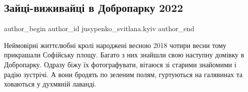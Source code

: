  
 
 
 
 
 
\subsection{Зайці-виживайці в Добропарку 2022}
\label{sec:22_07_2022.fb.jusypenko_svitlana.kyiv.1.zajci_vyzhyvajci_dobropark_2022}
 
\ifcmt
 author_begin
   author_id jusypenko_svitlana.kyiv
 author_end
\fi

Неймовірні життєлюбні кролі народжені весною 2018 чотири весни тому прикрашали
Софійську площу. Багато з них знайшли свою наступну домівку в Добропарку.
Одразу біжу їх фотографувати, вітаюся зі старими знайомими і радію зустрічі. А
вони бродять по зеленим полям, гуртуються на галявинах та ховаються у духмяній
лаванді.

